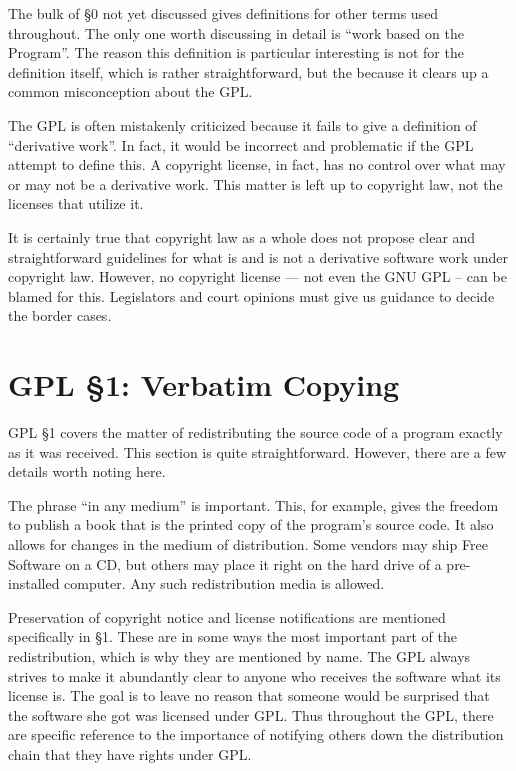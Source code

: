 \documentclass[12pt]{report}
\begin{document}
\medskip

The bulk of \S 0 not yet discussed gives definitions for other terms used
throughout.  The only one worth discussing in detail is ``work based on
the Program''.  The reason this definition is particular interesting is
not for the definition itself, which is rather straightforward, but the
because it clears up a common misconception about the GPL\@.

The GPL is often mistakenly criticized because it fails to give a
definition of ``derivative work''.  In fact, it would be incorrect and
problematic if the GPL attempt to define this.  A copyright license, in
fact, has no control over what may or may not be a derivative work.  This
matter is left up to copyright law, not the licenses that utilize it.

It is certainly true that copyright law as a whole does not propose clear
and straightforward guidelines for what is and is not a derivative
software work under copyright law.  However, no copyright license --- not
even the GNU GPL -- can be blamed for this.  Legislators and court
opinions must give us guidance to decide the border cases.

\section{GPL \S 1: Verbatim Copying}

GPL \S 1 covers the matter of redistributing the source code of a program
exactly as it was received.  This section is quite straightforward.
However, there are a few details worth noting here.

The phrase ``in any medium'' is important.  This, for example, gives the
freedom to publish a book that is the printed copy of the program's source
code.  It also allows for changes in the medium of distribution.  Some
vendors may ship Free Software on a CD, but others may place it right on
the hard drive of a pre-installed computer.  Any such redistribution media
is allowed.

Preservation of copyright notice and license notifications are mentioned
specifically in \S 1.  These are in some ways the most important part of
the redistribution, which is why they are mentioned by name.  The GPL
always strives to make it abundantly clear to anyone who receives the
software what its license is.  The goal is to leave no reason that someone
would be surprised that the software she got was licensed under GPL\@.
Thus throughout the GPL, there are specific reference to the importance of
notifying others down the distribution chain that they have rights under
GPL.
\end{document}
